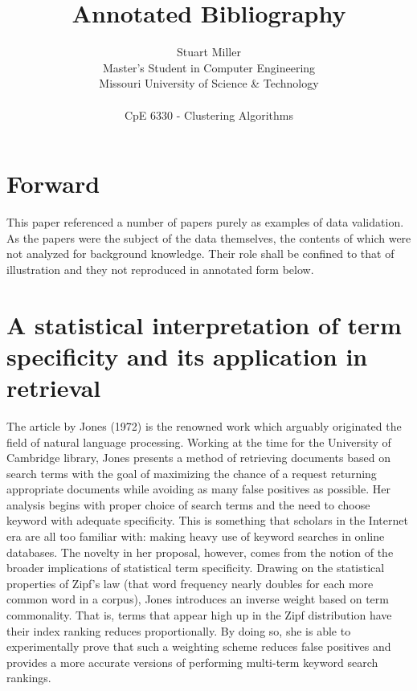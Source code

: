 \documentclass{article}
\begin{document}
\title{Annotated Bibliography}
\author{Stuart Miller\\
Master's Student in Computer Engineering\\
Missouri University of Science \& Technology \\ \\
CpE 6330 - Clustering Algorithms}

\maketitle

\pagebreak

\tableofcontents

\pagebreak

\section*{Forward}
This paper referenced a number of papers purely as examples of data validation. As the papers were the subject of the data themselves, the contents of which were not analyzed for background knowledge. Their role shall be confined to that of illustration and they not reproduced in annotated form below.

\section{A statistical interpretation of term specificity and its application in retrieval}

The article by Jones (1972) \cite{sparck1972statistical} is the renowned work which arguably originated the field of natural language processing. Working at the time for the University of Cambridge library, Jones presents a method of retrieving documents based on search terms with the goal of maximizing the chance of a request returning appropriate documents while avoiding as many false positives as possible. Her analysis begins with proper choice of search terms and the need to choose keyword with adequate specificity. This is something that scholars in the Internet era are all too familiar with: making heavy use of keyword searches in online databases. The novelty in her proposal, however, comes from the notion of the broader implications of statistical term specificity. Drawing on the statistical properties of Zipf's law (that word frequency nearly doubles for each more common word in a corpus), Jones introduces an inverse weight based on term commonality. That is, terms that appear high up in the Zipf distribution have their index ranking reduces proportionally. By doing so, she is able to experimentally prove that such a weighting scheme reduces false positives and provides a more accurate versions of performing multi-term keyword search rankings.
\end{document}
